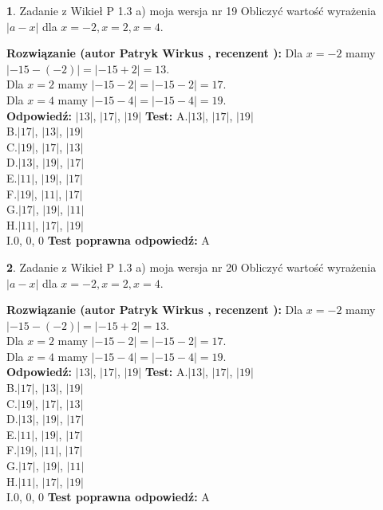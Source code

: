 \documentclass[12pt, a4paper]{article}
\theoremstyle{definition} %
\newtheorem{zad}{}
\newcommand{\zadStart}[1]{\begin{zad}#1\newline}
\newcommand{\zadStop}{\end{zad}}
\newcommand{\rozwStart}[2]{\noindent \textbf{Rozwiązanie (autor #1 , recenzent #2): }\newline}
\newcommand{\rozwStop}{\newline}
\newcommand{\odpStart}{\noindent \textbf{Odpowiedź:}\newline}
\newcommand{\odpStop}{\newline}
\newcommand{\testStart}{\noindent \textbf{Test:}\newline}
\newcommand{\testStop}{\newline}
\newcommand{\kluczStart}{\noindent \textbf{Test poprawna odpowiedź:}\newline}
\newcommand{\kluczStop}{\newline}
\begin{document}
\zadStart{Zadanie z Wikieł P 1.3 a) moja wersja nr 19}
Obliczyć wartość wyrażenia $|a - x|$ dla $x=-2,x=2,x=4$.
\zadStop
\rozwStart{Patryk Wirkus}{}
Dla $x = -2$ mamy $|-15 - (-2)| = |-15 + 2| = 13$.\\
Dla $x = 2$ mamy $|-15 - 2| = |-15 - 2| = 17$.\\
Dla $x = 4$ mamy $|-15 - 4| = |-15 - 4| = 19$.\\
\rozwStop
\odpStart
$|13|$, $|17|$, $|19|$
\odpStop
\testStart
A.$|13|$, $|17|$, $|19|$\\
B.$|17|$, $|13|$, $|19|$\\
C.$|19|$, $|17|$, $|13|$\\
D.$|13|$, $|19|$, $|17|$\\
E.$|11|$, $|19|$, $|17|$\\
F.$|19|$, $|11|$, $|17|$\\
G.$|17|$, $|19|$, $|11|$\\
H.$|11|$, $|17|$, $|19|$\\
I.$0$, $0$, $0$
\testStop
\kluczStart
A
\kluczStop



\zadStart{Zadanie z Wikieł P 1.3 a) moja wersja nr 20}
Obliczyć wartość wyrażenia $|a - x|$ dla $x=-2,x=2,x=4$.
\zadStop
\rozwStart{Patryk Wirkus}{}
Dla $x = -2$ mamy $|-15 - (-2)| = |-15 + 2| = 13$.\\
Dla $x = 2$ mamy $|-15 - 2| = |-15 - 2| = 17$.\\
Dla $x = 4$ mamy $|-15 - 4| = |-15 - 4| = 19$.\\
\rozwStop
\odpStart
$|13|$, $|17|$, $|19|$
\odpStop
\testStart
A.$|13|$, $|17|$, $|19|$\\
B.$|17|$, $|13|$, $|19|$\\
C.$|19|$, $|17|$, $|13|$\\
D.$|13|$, $|19|$, $|17|$\\
E.$|11|$, $|19|$, $|17|$\\
F.$|19|$, $|11|$, $|17|$\\
G.$|17|$, $|19|$, $|11|$\\
H.$|11|$, $|17|$, $|19|$\\
I.$0$, $0$, $0$
\testStop
\kluczStart
A
\kluczStop
\end{document}
